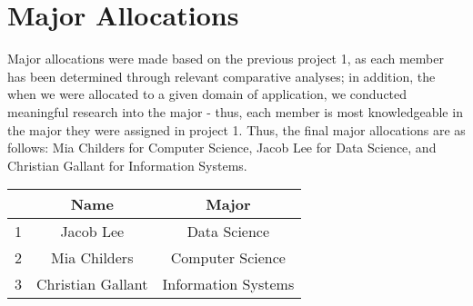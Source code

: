 
\section{\textbf{Major Allocations}}

Major allocations were made based on the previous project 1, as each member has been determined through relevant comparative analyses; in addition, the when we were allocated to a given domain of application, we conducted meaningful research into the major - thus, each member is most knowledgeable in the major they were assigned in project 1. Thus, the final major allocations are as follows: Mia Childers for Computer Science, Jacob Lee for Data Science, and Christian Gallant for Information Systems. 

\begin{center}
    \begin{tabular}{ |c|c|c| }
        \hline
        & Name & Major \\
      \hline
      1 & Jacob Lee & Data Science\\
      \hline
      2 & Mia Childers & Computer Science\\
      \hline
      3 & Christian Gallant & Information Systems\\
      \hline
    \end{tabular}
    \end{center}
